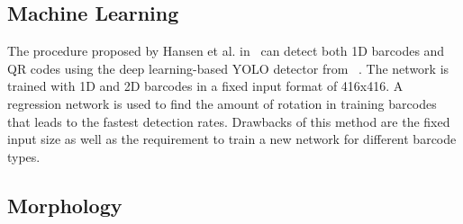 \documentclass[runningheads,a4paper]{llncs}
\begin{document}
\subsection{Machine Learning}

The procedure proposed by Hansen et al. in~\cite{hansen2017real} can detect both
1D barcodes and QR codes using the deep learning-based YOLO detector from
~\cite{redmon2017yolo9000}. The network is trained with 1D and 2D barcodes in a
fixed input format of 416x416. A regression network is used to find the amount
of rotation in training barcodes that leads to the fastest detection rates.
Drawbacks of this method are the fixed input size as well as the requirement to
train a new network for different barcode types.

\subsection{Morphology}



\end{document}
